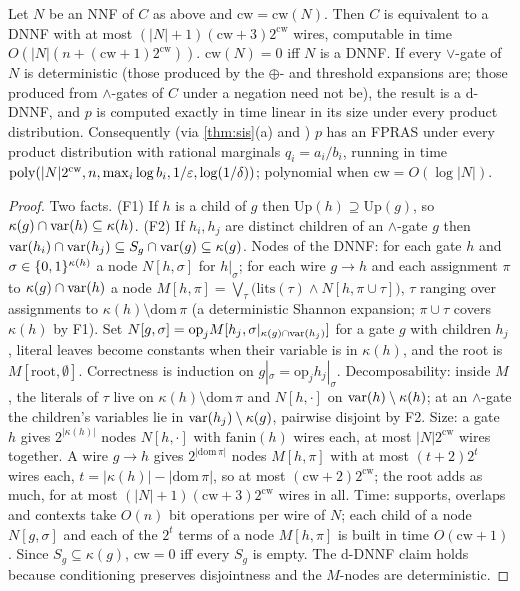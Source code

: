 \begin{theorem}\label{thm:cw}
Let $N$ be an NNF of $C$ as above and $\mathrm{cw}=\mathrm{cw}(N)$. Then $C$ is
equivalent to a DNNF with at most $(|N|+1)(\mathrm{cw}+3)2^{\mathrm{cw}}$ wires,
computable in time $O(|N|(n+(\mathrm{cw}+1)2^{\mathrm{cw}}))$. $\mathrm{cw}(N)=0$ iff
$N$ is a DNNF. If every $\vee$-gate of $N$ is deterministic (those produced by the
$\oplus$- and threshold expansions are; those produced from $\wedge$-gates of $C$ under
a negation need not be), the result is a d-DNNF, and $p$ is computed exactly in time
linear in its size under every product distribution. Consequently (via
\cref{thm:sis}(a) and \cite{meel2026dnnf}) $p$ has an FPRAS under every product
distribution with rational marginals $q_i=a_i/b_i$, running in time
$\mathrm{poly}(|N|2^{\mathrm{cw}},n,\max_i\log b_i,1/\varepsilon,\log(1/\delta))$; polynomial when
$\mathrm{cw}=O(\log|N|)$.
\end{theorem}

\begin{proof}
Two facts. (F1) If $h$ is a child of $g$ then $\mathrm{Up}(h)\supseteq\mathrm{Up}(g)$,
so $\kappa(g)\cap\mathrm{var}(h)\subseteq\kappa(h)$. (F2) If $h_i,h_j$ are distinct children
of an $\wedge$-gate $g$ then $\mathrm{var}(h_i)\cap\mathrm{var}(h_j)\subseteq S_g\cap\mathrm{var}(g)\subseteq\kappa(g)$.
Nodes of the DNNF: for each gate $h$ and $\sigma\in\{0,1\}^{\kappa(h)}$ a node
$N[h,\sigma]$ for $h|_\sigma$; for each wire $g\to h$ and each assignment $\pi$ to
$\kappa(g)\cap\mathrm{var}(h)$ a node
$M[h,\pi]=\bigvee_{\tau}\big(\mathrm{lits}(\tau)\wedge N[h,\pi\cup\tau]\big)$, $\tau$
ranging over assignments to $\kappa(h)\setminus\mathrm{dom}\,\pi$ (a deterministic
Shannon expansion; $\pi\cup\tau$ covers $\kappa(h)$ by F1). Set
$N[g,\sigma]=\mathrm{op}_j M[h_j,\sigma|_{\kappa(g)\cap\mathrm{var}(h_j)}]$ for a gate $g$ with
children $h_j$, literal leaves become constants when their variable is in
$\kappa(h)$, and the root is $M[\mathrm{root},\emptyset]$. Correctness is induction
on $g|_\sigma=\mathrm{op}_jh_j|_{\sigma}$. Decomposability: inside $M$, the literals
of $\tau$ live on $\kappa(h)\setminus\mathrm{dom}\,\pi$ and $N[h,\cdot]$ on
$\mathrm{var}(h)\setminus\kappa(h)$; at an $\wedge$-gate the children's variables lie in
$\mathrm{var}(h_j)\setminus\kappa(g)$, pairwise disjoint by F2.
Size: a gate $h$ gives $2^{|\kappa(h)|}$ nodes $N[h,\cdot]$ with $\mathrm{fanin}(h)$
wires each, at most $|N|2^{\mathrm{cw}}$ wires together. A wire $g\to h$ gives
$2^{|\mathrm{dom}\,\pi|}$ nodes $M[h,\pi]$ with at most $(t+2)2^t$ wires each,
$t=|\kappa(h)|-|\mathrm{dom}\,\pi|$, so at most $(\mathrm{cw}+2)2^{\mathrm{cw}}$; the root
adds as much, for at most $(|N|+1)(\mathrm{cw}+3)2^{\mathrm{cw}}$ wires in all.
Time: supports, overlaps and contexts take $O(n)$ bit operations per wire of $N$;
each child of a node $N[g,\sigma]$ and each of the $2^t$ terms of a node $M[h,\pi]$
is built in time $O(\mathrm{cw}+1)$.
Since $S_g\subseteq\kappa(g)$, $\mathrm{cw}=0$ iff every $S_g$ is empty.
The d-DNNF claim holds because conditioning preserves disjointness and the
$M$-nodes are deterministic.
\end{proof}

